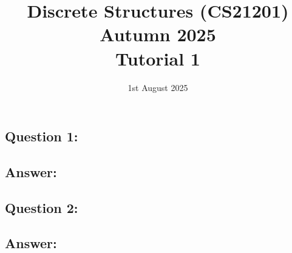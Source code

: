 \documentclass{article}
\title{\large Discrete Structures (CS21201) Autumn 2025\\ \vspace{0.5em} \LARGE Tutorial 1}
\date{1st August 2025}
\begin{document}
\maketitle

\subsection*{Question 1:}

\subsection*{Answer:}

\subsection*{Question 2:}

\subsection*{Answer:}
\end{document}
